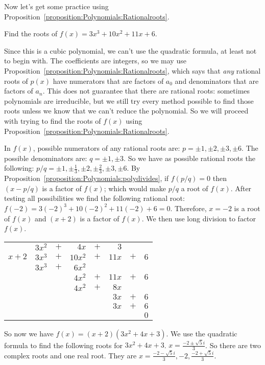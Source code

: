 Now let's get some practice using Proposition~\ref{proposition:Polynomials:Rationalroots}.

\begin{example}{}
Find the roots of $f(x)=3x^3+10x^2+11x+6$.

Since this is a cubic polynomial, we can't use the quadratic formula, at least not to begin with. The coefficients are integers, so we may use Proposition~\ref{proposition:Polynomials:Rationalroots}, which says that \emph{any} rational roots of $p(x)$ have numerators that are factors of $a_{0}$ and denominators that  are factors of $a_{n}$. This does not guarantee that there are rational roots: sometimes polynomials are irreducible, but we still try every method possible to find those roots unless we know that we can't reduce the polynomial. So we will proceed with trying to find the roots of $f(x)$ using Proposition~\ref{proposition:Polynomials:Rationalroots}.

In $f(x)$, possible numerators of any rational roots are: $p=\pm1, \pm2, \pm3, \pm6$. The possible denominators are: $q=\pm1, \pm3$.
So we have as possible rational roots the following: $p/q= \pm1, \pm\frac{1}{3}, \pm2, \pm\frac{2}{3},\pm3, \pm6$.
By Proposition~\ref{proposition:Polynomials:polydivides}, if $f(p/q)=0$ then $(x-p/q)$ is a factor of $f(x)$; which would make $p/q$ a root of $f(x)$. After testing all possibilities we find the following rational root:
$f(-2)=3(-2)^3+10(-2)^2+11(-2)+6=0$. Therefore, $x=-2$ is a root of $f(x)$ and $(x+2)$ is a factor of $f(x)$.
We then use long division to factor $f(x)$.

\begin{center}
\begin{tabular}{rrcrcrcr}
        &  $3x^2$  &  $+$  &      $4x$  &  $+$  &    $3$  &       &       \\ \cline{2-8}
 \multicolumn{1}{r|}{$x + 2$}
        &  $3x^3$  &  $+$  &    $10x^2$  &  $+$  & $ 11x$  &  $+$  &  $6$  \\
        &  $3x^3$  &  $+$  &    $6 x^2$  &       &         &       &       \\ \cline{2-8}
        &         &       &                $4x^2$  & $+$  &  $ 11x$  &  $+$  &  $6$  \\
        &         &       &                $4x^2$  &  $+$  & $ 8x$  &       &       \\ \cline{4-8}
        &         &       &           &       &                         $3 x$  & $+$  & $6$  \\
        &         &       &           &       &                          $3x$  & $+$  & $6$  \\ \cline{6-8}
        &         &       &           &       &         &       &                               $0$
\end{tabular}
\end{center}
So now we have $f(x)=(x+2)(3x^2+4x+3)$. We use the quadratic formula to find the following roots for $3x^2+4x+3$.
$x=\frac{-2\pm \sqrt{5}i}{3}$.
So there are two complex roots and one real root. They are $x={\frac{-2 - \sqrt{5}i}{3}, -2, \frac{-2+ \sqrt{5}i}{3}}$.
\end{example}

